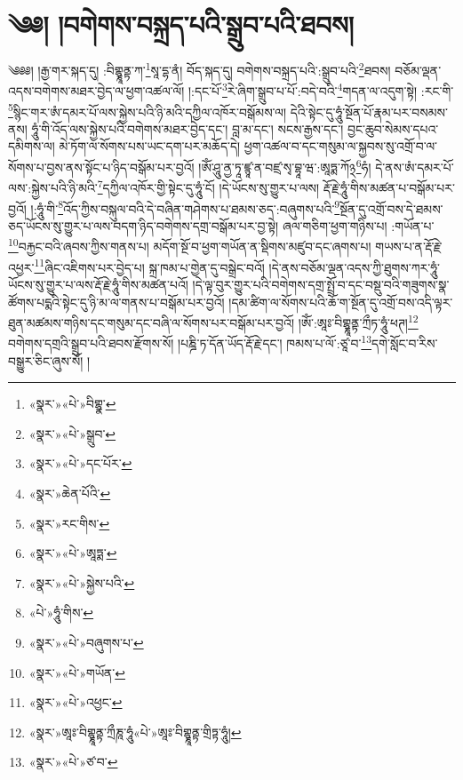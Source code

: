 \chapter{༄༅། །བགེགས་བསྐྲད་པའི་སྒྲུབ་པའི་ཐབས།}༄༅༅། །རྒྱ་གར་སྐད་དུ། :བིགྷྣཱནྟ་ཀ་\footnote{«སྣར་»«པེ་»བིགྷྣ་}སཱ་དྷ་ནཾ། བོད་སྐད་དུ། བགེགས་བསྐྲད་པའི་:སྒྲུབ་པའི་\footnote{«སྣར་»«པེ་»སྒྲུབ་}ཐབས། བཅོམ་ལྡན་འདས་བགེགས་མཐར་བྱེད་ལ་ཕྱག་འཚལ་ལོ། །:དང་པོ་\footnote{«སྣར་»«པེ་»དང་པོར་}རེ་ཞིག་སྒྲུབ་པ་པོ་:བདེ་བའི་\footnote{«སྣར་»ཆེན་པོའི་}གདན་ལ་འདུག་སྟེ། :རང་གི་\footnote{«སྣར་»རང་གིས་}སྙིང་གར་ཨཾ་དམར་པོ་ལས་སྐྱེས་པའི་ཉི་མའི་དཀྱིལ་འཁོར་བསྒོམས་ལ། དེའི་སྟེང་དུ་ཧཱུཾ་སྔོན་པོ་རྣམ་པར་བསམས་ནས། ཧཱུཾ་གི་འོད་ལས་སྐྱེས་པའི་བགེགས་མཐར་བྱེད་དང་། བླ་མ་དང་། སངས་རྒྱས་དང་། བྱང་ཆུབ་སེམས་དཔའ་དམིགས་ལ། མེ་ཏོག་ལ་སོགས་པས་ཡང་དག་པར་མཆོད་དེ། ཕྱག་འཚལ་བ་དང་གསུམ་ལ་སྐྱབས་སུ་འགྲོ་བ་ལ་སོགས་པ་བྱས་ནས་སྟོང་པ་ཉིད་བསྒོམ་པར་བྱའོ། །ཨོཾ་ཤཱུ་ནྱ་ཏཱ་ཛྙཱ་ན་བཛྲ་སྭ་བྷཱ་ཝ་:ཨཱཏྨ་ཀོ྅\footnote{«སྣར་»«པེ་»ཨཱཏྨ་}ཧཾ། དེ་ནས་ཨཾ་དམར་པོ་ལས་:སྐྱེས་པའི་ཉི་མའི་\footnote{«སྣར་»«པེ་»སྐྱེས་པའི་}དཀྱིལ་འཁོར་གྱི་སྟེང་དུ་ཧཱུཾ་ངོ། །དེ་ཡོངས་སུ་གྱུར་པ་ལས། རྡོ་རྗེ་ཧཱུཾ་གིས་མཚན་པ་བསྒོམ་པར་བྱའོ། །:ཧཱུཾ་གི་\footnote{«པེ་»ཧཱུཾ་གིས་}འོད་ཀྱིས་བསྐུལ་བའི་དེ་བཞིན་གཤེགས་པ་ཐམས་ཅད་:བཞུགས་པའི་\footnote{«སྣར་»«པེ་»བཞུགས་པ་}སྔོན་དུ་འགྲོ་བས་དེ་ཐམས་ཅད་ཡོངས་སུ་གྱུར་པ་ལས་བདག་ཉིད་བགེགས་དགྲ་བསྒོམ་པར་བྱ་སྟེ། ཞལ་གཅིག་ཕྱག་གཉིས་པ། :གཡོན་པ་\footnote{«སྣར་»«པེ་»གཡོན་}བརྐྱང་བའི་ཞབས་ཀྱིས་གནས་པ། མདོག་སྔོ་བ་ཕྱག་གཡོན་ན་སྡིགས་མཛུབ་དང་ཞགས་པ། གཡས་པ་ན་རྡོ་རྗེ་འཕྱར་\footnote{«སྣར་»«པེ་»འཕྱང་}ཞིང་འཇིགས་པར་བྱེད་པ། སྐྲ་ཁམ་པ་གྱེན་དུ་བསྒྲེང་བའོ། །དེ་ནས་བཅོམ་ལྡན་འདས་ཀྱི་ཐུགས་ཀར་ཧཱུཾ་ཡོངས་སུ་གྱུར་པ་ལས་རྡོ་རྗེ་ཧཱུཾ་གིས་མཚན་པའོ། །དེ་ལྟ་བུར་གྱུར་པའི་བགེགས་དགྲ་སྤྲོ་བ་དང་བསྡུ་བའི་གཟུགས་སྣ་ཚོགས་པདྨའི་སྟེང་དུ་ཉི་མ་ལ་གནས་པ་བསྒོམ་པར་བྱའོ། །དམ་ཚིག་ལ་སོགས་པའི་ཆོ་ག་སྔོན་དུ་འགྲོ་བས་འདི་ལྟར་ཐུན་མཚམས་གཉིས་དང་གསུམ་དང་བཞི་ལ་སོགས་པར་བསྒོམ་པར་བྱའོ། །ཨོཾ་:ཨཱཿ་བིགྷྣཱནྟ་ཀྲྀཏ་ཧཱུཾ་ཕཊ།\footnote{«སྣར་»ཨཱཿ་བིགྷྣཱནྟ་ཀྲྀཎཱ་ཧཱུཾ«པེ་»ཨཱཿ་བིགྷྣཱནྟ་གྲིཏྟ་ཧཱུཾ།} བགེགས་དགྲའི་སྒྲུབ་པའི་ཐབས་རྫོགས་སོ། །པཎྜི་ཏ་དོན་ཡོད་རྡོ་རྗེ་དང་། ཁམས་པ་ལོ་:ཙཱ་བ་\footnote{«སྣར་»«པེ་»ཙ་བ་}དགེ་སློང་བ་རིས་བསྒྱུར་ཅིང་ཞུས་སོ། ། 